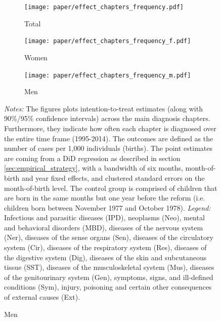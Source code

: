 \documentclass[11pt, a4paper, draft]{article} %
\begin{document}
\begin{landscape}
	\vspace*{\fill}
	\begin{figure}[H]\centering
		\caption{Intention-to-treat effects across \textbf{main diagnosis chapters}}\label{fig: DD_across_main chapters}
		\begin{subfigure}[h]{0.31\linewidth}\centering\caption{Total}
			\texttt{[image: paper/effect\_chapters\_frequency.pdf]}
		\end{subfigure}
		\begin{subfigure}[h]{0.31\linewidth}\centering\caption{Women}
			\texttt{[image: paper/effect\_chapters\_frequency\_f.pdf]}
		\end{subfigure}
		\begin{subfigure}[h]{0.31\linewidth}\centering\caption{Men}
			\texttt{[image: paper/effect\_chapters\_frequency\_m.pdf]}
		\end{subfigure}
		\scriptsize
		\begin{minipage}{\linewidth}
			\emph{Notes:} The figures plots intention-to-treat estimates (along with 90\%/95\% confidence intervals) across the main diagnosis chapters. Furthermore, they indicate how often each chapter is diagnosed over the entire time frame (1995-2014). The outcomes are defined as the number of cases per 1,000 individuals (births). The point estimates are coming from a DiD regression as described in section \ref{sec:empirical_strategy}, with a bandwidth of six months, month-of-birth and year fixed effects, and clustered standard errors on the month-of-birth level. The control group is comprised of children	that are born in the same months but one year before the reform (i.e. children born between November 1977 and October 1978). \newline
			\emph{Legend:} Infectious and parasitic diseases (IPD), neoplasms (Neo), mental and behavioral disorders (MBD), diseases of the nervous system (Ner), diseases of the sense organs (Sen), diseases of the circulatory system (Cir), diseases of the respiratory system (Res), diseases of the digestive system (Dig), diseases of the skin and subcutaneous tissue (SST), diseases of the musculoskeletal system (Mus), diseases of the genitourinary system (Gen), symptoms, signs, and ill-defined conditions (Sym), injury, poisoning and certain other consequences of external causes (Ext).
			
		\end{minipage}
	\end{figure}
	\vspace*{\fill}\clearpage
\end{landscape}
\end{document}
